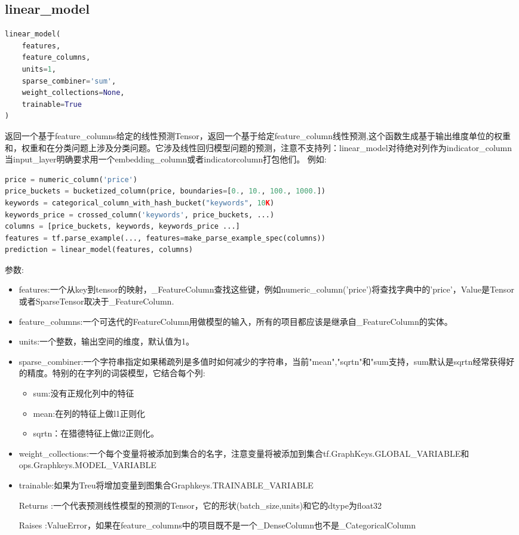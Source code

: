 \subsection{linear\_model}
\begin{lstlisting}[language=Python]
linear_model(
    features,
    feature_columns,
    units=1,
    sparse_combiner='sum',
    weight_collections=None,
    trainable=True
)
\end{lstlisting}
返回一个基于feature\_columns给定的线性预测Tensor，返回一个基于给定feature\_column线性预测,这个函数生成基于输出维度单位的权重和，权重和在分类问题上涉及分类问题。它涉及线性回归模型问题的预测，注意不支持列：linear\_model对待绝对列作为indicator\_column当input\_layer明确要求用一个embedding\_column或者indicator\-column打包他们。
例如:
\begin{lstlisting}[language=Python]
price = numeric_column('price')
price_buckets = bucketized_column(price, boundaries=[0., 10., 100., 1000.])
keywords = categorical_column_with_hash_bucket("keywords", 10K)
keywords_price = crossed_column('keywords', price_buckets, ...)
columns = [price_buckets, keywords, keywords_price ...]
features = tf.parse_example(..., features=make_parse_example_spec(columns))
prediction = linear_model(features, columns)
\end{lstlisting}
参数:
\begin{itemize}
	\item features:一个从key到tensor的映射，\_FeatureColumn查找这些键，例如numeric\_column('price')将查找字典中的'price'，Value是Tensor或者SparseTensor取决于\_FeatureColumn.
	\item feature\_columns:一个可迭代的FeatureColumn用做模型的输入，所有的项目都应该是继承自\_FeatureColumn的实体。
	\item units:一个整数，输出空间的维度，默认值为1。
	\item sparse\_combiner:一个字符串指定如果稀疏列是多值时如何减少的字符串，当前"mean","sqrtn"和"sum支持，sum默认是sqrtn经常获得好的精度。特别的在字列的词袋模型，它结合每个列:
	\begin{itemize}
	\item sum:没有正规化列中的特征
	\item mean:在列的特征上做l1正则化
	\item sqrtn：在猎德特征上做l2正则化。
	\end{itemize}
	\item weight\_collections:一个每个变量将被添加到集合的名字，注意变量将被添加到集合tf.GraphKeys.GLOBAL\_VARIABLE和ops.Graphkeys.MODEL\_VARIABLE
	\item trainable:如果为Treu将增加变量到图集合Graphkeys.TRAINABLE\_VARIABLE
	\item[Returns]:一个代表预测线性模型的预测的Tensor，它的形状(batch\_size,units)和它的dtype为float32
	\item[Raises]:ValueError，如果在feature\_columns中的项目既不是一个\_DenseColumn也不是\_CategoricalColumn
\end{itemize}
